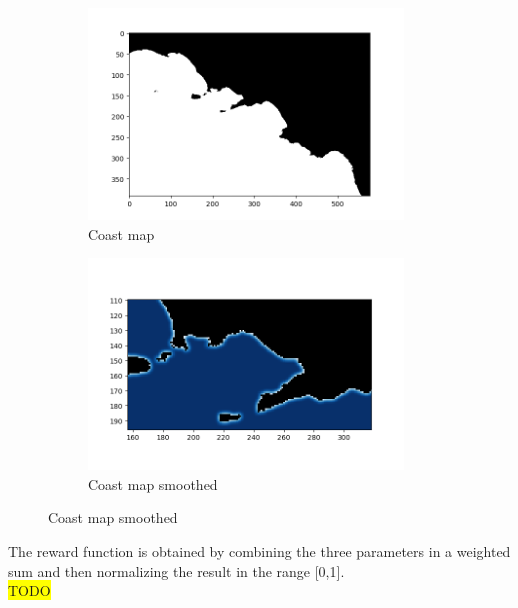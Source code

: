 \documentclass[journal,article,submit,pdftex,moreauthors]{Definitions/mdpi}
\begin{document}
\begin{figure}[h]
	\begin{subfigure}{0.5\textwidth}
		\centering
		\includegraphics[width=\textwidth]{res/imgs/coast.png}
		\caption{Coast map}
		\label{fig:coast}
	\end{subfigure}
	\begin{subfigure}{0.5\textwidth}
		\centering
		\includegraphics[width=\textwidth]{res/imgs/coastBlur.png}
		\caption{Coast map smoothed}
		\label{fig:coastBlur}
	\end{subfigure}
\end{figure}

The reward function is obtained by combining the three parameters in a weighted sum and then normalizing the result in the range [0,1].\\

\colorbox{yellow}{TODO}
\end{document}
